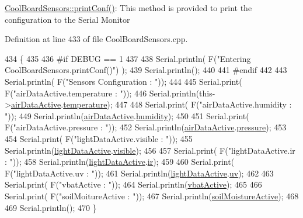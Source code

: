\hyperlink{class_cool_board_sensors_af6fd79505815b204c178617ecf54c873}{Cool\+Board\+Sensors\+::print\+Conf()}\+: This method is provided to print the configuration to the Serial Monitor 

Definition at line 433 of file Cool\+Board\+Sensors.\+cpp.


\begin{DoxyCode}
434 \{
435 
436 \textcolor{preprocessor}{#if DEBUG == 1}
437 
438     Serial.println( F(\textcolor{stringliteral}{"Entering CoolBoardSensors.printConf()"}) );
439     Serial.println();
440 
441 \textcolor{preprocessor}{#endif}
442 
443     Serial.println( F(\textcolor{stringliteral}{"Sensors Configuration : "}));
444     
445     Serial.print( F(\textcolor{stringliteral}{"airDataActive.temperature : "}));
446     Serial.println(this->\hyperlink{class_cool_board_sensors_abff8dfeccb2f7689847bb64d5f1cd31e}{airDataActive}.\hyperlink{struct_cool_board_sensors_1_1air_active_a9a6633c426b0508e30ebc1832ec6d745}{temperature});
447 
448     Serial.print( F(\textcolor{stringliteral}{"airDataActive.humidity : "}));
449     Serial.println(\hyperlink{class_cool_board_sensors_abff8dfeccb2f7689847bb64d5f1cd31e}{airDataActive}.\hyperlink{struct_cool_board_sensors_1_1air_active_ae5740445054b27415e22f450576accb7}{humidity});
450 
451     Serial.print( F(\textcolor{stringliteral}{"airDataActive.pressure : "}));
452     Serial.println(\hyperlink{class_cool_board_sensors_abff8dfeccb2f7689847bb64d5f1cd31e}{airDataActive}.\hyperlink{struct_cool_board_sensors_1_1air_active_ab200826a70d1dc9945f5efb6b9c732ed}{pressure});
453 
454     Serial.print( F(\textcolor{stringliteral}{"lightDataActive.visible : "}));
455     Serial.println(\hyperlink{class_cool_board_sensors_ac4deb1cf41bac8b91c780c92fab00ba4}{lightDataActive}.\hyperlink{struct_cool_board_sensors_1_1light_active_abcbba296b6a95e67c0cd2555d9dd50c7}{visible});
456 
457     Serial.print( F(\textcolor{stringliteral}{"lightDataActive.ir : "}));
458     Serial.println(\hyperlink{class_cool_board_sensors_ac4deb1cf41bac8b91c780c92fab00ba4}{lightDataActive}.\hyperlink{struct_cool_board_sensors_1_1light_active_a67700895349b95ceb263f1a6da756315}{ir});
459 
460     Serial.print( F(\textcolor{stringliteral}{"lightDataActive.uv : "}));
461     Serial.println(\hyperlink{class_cool_board_sensors_ac4deb1cf41bac8b91c780c92fab00ba4}{lightDataActive}.\hyperlink{struct_cool_board_sensors_1_1light_active_a949a7aaf5166d981de8fe0fd93da20d6}{uv});
462     
463     Serial.print( F(\textcolor{stringliteral}{"vbatActive : "}));
464     Serial.println(\hyperlink{class_cool_board_sensors_af5039ad760b0ff0aa7eee16c55e81702}{vbatActive});
465 
466     Serial.print( F(\textcolor{stringliteral}{"soilMoitureActive : "}));
467     Serial.println(\hyperlink{class_cool_board_sensors_a31983eecc0f9cd000e1f912206ea4dc8}{soilMoistureActive});
468 
469     Serial.println();
470 \}
\end{DoxyCode}
